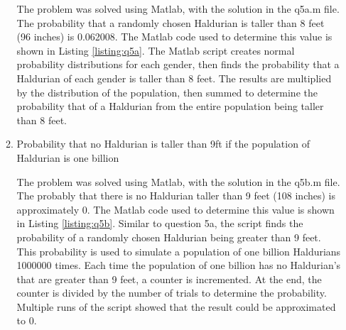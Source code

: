 \documentclass[12pt]{article}
\begin{document}
\begin{enumerate}
\begin{enumerate}
        The problem was solved using Matlab, with the solution in the q5a.m file. The probability that a randomly chosen Haldurian is taller than 8 feet (96 inches) is 0.062008. The Matlab code used to determine this value is shown in Listing \ref{listing:q5a}. The Matlab script creates normal probability distributions for each gender, then finds the probability that a Haldurian of each gender is taller than 8 feet. The results are multiplied by the distribution of the population, then summed to determine the probability that of a Haldurian from the entire population being taller than 8 feet.
        
        

        \item Probability that no Haldurian is taller than 9ft if the population of Haldurian is one billion 

        The problem was solved using Matlab, with the solution in the q5b.m file. The probably that there is no Haldurian taller than 9 feet (108 inches) is approximately 0. The Matlab code used to determine this value is shown in Listing \ref{listing:q5b}. Similar to question 5a, the script finds the probability of a randomly chosen Haldurian being greater than 9 feet. This probability is used to simulate a population of one billion Haldurians 1000000 times. Each time the population of one billion has no Haldurian's that are greater than 9 feet, a counter is incremented. At the end, the counter is divided by the number of trials to determine the probability. Multiple runs of the script showed that the result could be approximated to 0.

        
    \end{enumerate}


\end{enumerate}
\end{document}
